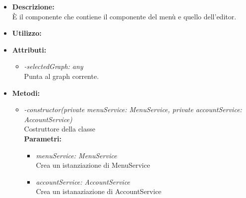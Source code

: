 \begin{itemize}
	\item \textbf{Descrizione:}\\
	È il componente che contiene il componente del menù e quello dell'editor.
	\item \textbf{Utilizzo:}\\

	\item \textbf{Attributi:}
		\begin{itemize}
			\item \emph{-selectedGraph: any}\\
			Punta al graph corrente.
		\end{itemize}
	\item \textbf{Metodi:}
		\begin{itemize}
			\item \emph{-constructor(private menuService: MenuService,
    private accountService: AccountService)}\\
    		Costruttore della classe\\
    		\textbf{Parametri:}
    		\begin{itemize}
    			\item \emph{menuService: MenuService}\\
    			Crea un istanziazione di MenuService  			
    			\item \emph{accountService: AccountService}\\
    			Crea un istanaziazione di AccountService
    		\end{itemize}
    	\end{itemize}
\end{itemize}